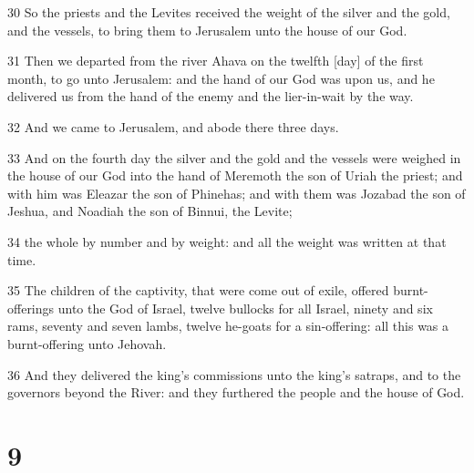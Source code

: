 \par 30 So the priests and the Levites received the weight of the silver and the gold, and the vessels, to bring them to Jerusalem unto the house of our God.
\par 31 Then we departed from the river Ahava on the twelfth [day] of the first month, to go unto Jerusalem: and the hand of our God was upon us, and he delivered us from the hand of the enemy and the lier-in-wait by the way.
\par 32 And we came to Jerusalem, and abode there three days.
\par 33 And on the fourth day the silver and the gold and the vessels were weighed in the house of our God into the hand of Meremoth the son of Uriah the priest; and with him was Eleazar the son of Phinehas; and with them was Jozabad the son of Jeshua, and Noadiah the son of Binnui, the Levite;
\par 34 the whole by number and by weight: and all the weight was written at that time.
\par 35 The children of the captivity, that were come out of exile, offered burnt-offerings unto the God of Israel, twelve bullocks for all Israel, ninety and six rams, seventy and seven lambs, twelve he-goats for a sin-offering: all this was a burnt-offering unto Jehovah.
\par 36 And they delivered the king's commissions unto the king's satraps, and to the governors beyond the River: and they furthered the people and the house of God.

\chapter{9}

